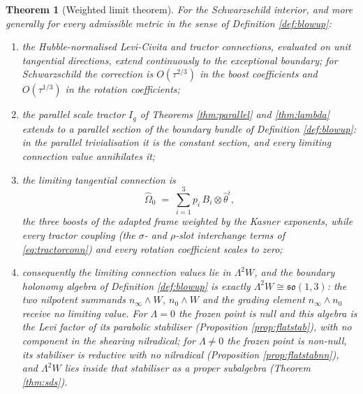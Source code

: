 \documentclass[11pt]{article}
\newtheorem{theorem}{Theorem}[section]
\theoremstyle{definition}
\newcommand{\nO}{n_0}
\newcommand{\nInf}{n_\infty}
\begin{document}
\begin{theorem}[Weighted limit theorem]\label{thm:weighted}
For the Schwarzschild interior, and more generally for every admissible metric in the sense of Definition \ref{def:blowup}:
\begin{enumerate}
\item the Hubble-normalised Levi-Civita and tractor connections, evaluated on unit tangential directions, extend continuously to the exceptional boundary; for Schwarzschild the correction is $O(\tau^{2/3})$ in the boost coefficients and $O(\tau^{1/3})$ in the rotation coefficients;
\item the parallel scale tractor $I_g$ of Theorems \ref{thm:parallel} and \ref{thm:lambda} extends to a parallel section of the boundary bundle of Definition \ref{def:blowup}: in the parallel trivialisation it is the constant section, and every limiting connection value annihilates it;
\item the limiting tangential connection is
\[
\widehat\Omega_0 \;=\; \sum_{i=1}^3 p_i\, B_i \otimes \hat\theta^i ,
\]
the three boosts of the adapted frame weighted by the Kasner exponents, while every tractor coupling (the $\sigma$- and $\rho$-slot interchange terms of \eqref{eq:tractorconn}) and every rotation coefficient scales to zero;
\item consequently the limiting connection values lie in $\Lambda^2 W$, and the boundary holonomy algebra of Definition \ref{def:blowup} is exactly $\Lambda^2 W \cong \mathfrak{so}(1,3)$: the two nilpotent summands $\nInf \wedge W$, $\nO \wedge W$ and the grading element $\nInf \wedge \nO$ receive no limiting value. For $\Lambda = 0$ the frozen point is null and this algebra is the Levi factor of its parabolic stabiliser (Proposition \ref{prop:flatstab}), with no component in the shearing nilradical; for $\Lambda \neq 0$ the frozen point is non-null, its stabiliser is reductive with no nilradical (Proposition \ref{prop:flatstabnn}), and $\Lambda^2 W$ lies inside that stabiliser as a proper subalgebra (Theorem \ref{thm:sds}).
\end{enumerate}

\end{theorem}
\end{document}
